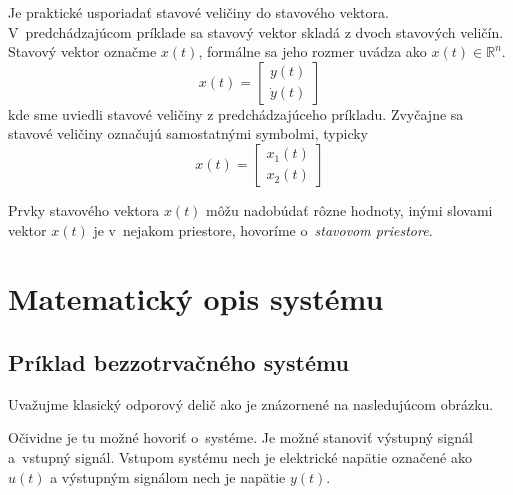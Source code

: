 \documentclass[a4paper, 10pt, ]{article}
\begin{document}
Je praktické usporiadať stavové veličiny do stavového vektora. V~predchádzajúcom príklade sa stavový vektor skladá z dvoch stavových veličín. Stavový vektor označme $x(t)$, formálne sa jeho rozmer uvádza ako $x(t) \in \mathbb R^n$.
\begin{equation}
    x(t) = 
    \begin{bmatrix}
        y(t) \\ \dot y(t)
    \end{bmatrix}
\end{equation}
kde sme uviedli stavové veličiny z predchádzajúceho príkladu. Zvyčajne sa stavové veličiny označujú samostatnými symbolmi, typicky
\begin{equation}
    x(t) = 
    \begin{bmatrix}
        x_1(t) \\ x_2(t)
    \end{bmatrix}
\end{equation}

Prvky stavového vektora $x(t)$ môžu nadobúdať rôzne hodnoty, inými slovami vektor $x(t)$ je v~nejakom priestore, hovoríme o~\emph{stavovom priestore}.










\section{Matematický opis systému}

\subsection{Príklad bezzotrvačného systému}

Uvažujme klasický odporový delič ako je znázornené na nasledujúcom obrázku.


\begin{center}
    \centering

    \makebox[\textwidth][c]{%
    
    }

    \label{OdporovyDelic}
\end{center}

Očividne je tu možné hovoriť o~systéme. Je možné stanoviť výstupný signál a~vstupný signál. Vstupom systému nech je elektrické napätie označené ako $u(t)$ a výstupným signálom nech je napätie $y(t)$.
\end{document}
